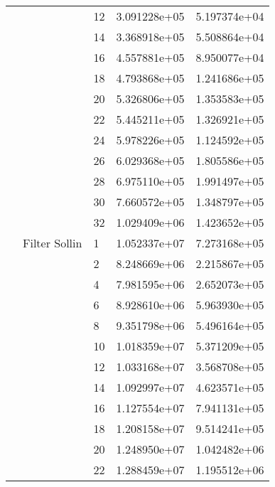 \begin{tabular}{lllrr}
                      &            & 12 &  3.091228e+05 &  5.197374e+04 \\
                      &            & 14 &  3.368918e+05 &  5.508864e+04 \\
                      &            & 16 &  4.557881e+05 &  8.950077e+04 \\
                      &            & 18 &  4.793868e+05 &  1.241686e+05 \\
                      &            & 20 &  5.326806e+05 &  1.353583e+05 \\
                      &            & 22 &  5.445211e+05 &  1.326921e+05 \\
                      &            & 24 &  5.978226e+05 &  1.124592e+05 \\
                      &            & 26 &  6.029368e+05 &  1.805586e+05 \\
                      &            & 28 &  6.975110e+05 &  1.991497e+05 \\
                      &            & 30 &  7.660572e+05 &  1.348797e+05 \\
                      &            & 32 &  1.029409e+06 &  1.423652e+05 \\
                      & Filter Sollin & 1  &  1.052337e+07 &  7.273168e+05 \\
                      &            & 2  &  8.248669e+06 &  2.215867e+05 \\
                      &            & 4  &  7.981595e+06 &  2.652073e+05 \\
                      &            & 6  &  8.928610e+06 &  5.963930e+05 \\
                      &            & 8  &  9.351798e+06 &  5.496164e+05 \\
                      &            & 10 &  1.018359e+07 &  5.371209e+05 \\
                      &            & 12 &  1.033168e+07 &  3.568708e+05 \\
                      &            & 14 &  1.092997e+07 &  4.623571e+05 \\
                      &            & 16 &  1.127554e+07 &  7.941131e+05 \\
                      &            & 18 &  1.208158e+07 &  9.514241e+05 \\
                      &            & 20 &  1.248950e+07 &  1.042482e+06 \\
                      &            & 22 &  1.288459e+07 &  1.195512e+06 \\

\end{tabular}
